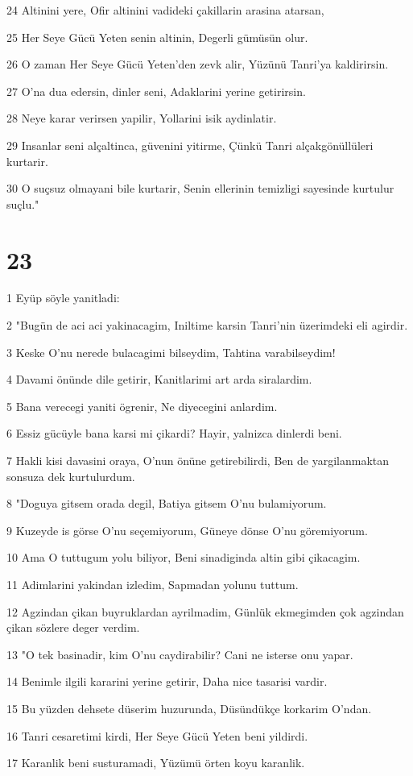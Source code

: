 \par 24 Altinini yere, Ofir altinini vadideki çakillarin arasina atarsan,
\par 25 Her Seye Gücü Yeten senin altinin, Degerli gümüsün olur.
\par 26 O zaman Her Seye Gücü Yeten'den zevk alir, Yüzünü Tanri'ya kaldirirsin.
\par 27 O'na dua edersin, dinler seni, Adaklarini yerine getirirsin.
\par 28 Neye karar verirsen yapilir, Yollarini isik aydinlatir.
\par 29 Insanlar seni alçaltinca, güvenini yitirme, Çünkü Tanri alçakgönüllüleri kurtarir.
\par 30 O suçsuz olmayani bile kurtarir, Senin ellerinin temizligi sayesinde kurtulur suçlu."

\chapter{23}

\par 1 Eyüp söyle yanitladi:
\par 2 "Bugün de aci aci yakinacagim, Iniltime karsin Tanri'nin üzerimdeki eli agirdir.
\par 3 Keske O'nu nerede bulacagimi bilseydim, Tahtina varabilseydim!
\par 4 Davami önünde dile getirir, Kanitlarimi art arda siralardim.
\par 5 Bana verecegi yaniti ögrenir, Ne diyecegini anlardim.
\par 6 Essiz gücüyle bana karsi mi çikardi? Hayir, yalnizca dinlerdi beni.
\par 7 Hakli kisi davasini oraya, O'nun önüne getirebilirdi, Ben de yargilanmaktan sonsuza dek kurtulurdum.
\par 8 "Doguya gitsem orada degil, Batiya gitsem O'nu bulamiyorum.
\par 9 Kuzeyde is görse O'nu seçemiyorum, Güneye dönse O'nu göremiyorum.
\par 10 Ama O tuttugum yolu biliyor, Beni sinadiginda altin gibi çikacagim.
\par 11 Adimlarini yakindan izledim, Sapmadan yolunu tuttum.
\par 12 Agzindan çikan buyruklardan ayrilmadim, Günlük ekmegimden çok agzindan çikan sözlere deger verdim.
\par 13 "O tek basinadir, kim O'nu caydirabilir? Cani ne isterse onu yapar.
\par 14 Benimle ilgili kararini yerine getirir, Daha nice tasarisi vardir.
\par 15 Bu yüzden dehsete düserim huzurunda, Düsündükçe korkarim O'ndan.
\par 16 Tanri cesaretimi kirdi, Her Seye Gücü Yeten beni yildirdi.
\par 17 Karanlik beni susturamadi, Yüzümü örten koyu karanlik.

